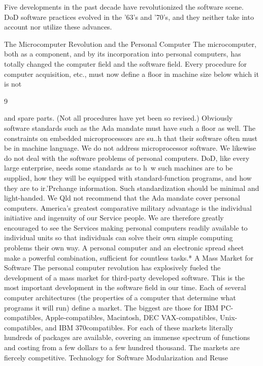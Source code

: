 \documentclass[12pt]{article}
\begin{document}
Five developments in the past decade have revolutionized the software scene. DoD
software practices evolved in the '63's and '70's, and they neither take into account nor
utilize these advances.

The Microcomputer Revolution and the Personal Computer
The microcomputer, both as a component, and by its incorporation into personal
computers, has totally changed the computer field and the software field. Every procedure
for computer acquisition, etc., must now define a floor in machine size below which it is not

9

and spare parts. (Not all procedures have yet been so revised.)
Obviously software standards such as the Ada mandate must have such a floor as well.
The constraints on embedded microprocessors are su..h that their software often must be
in machine language. We do not address microprocessor software.
We likewise do not deal with the software problems of personal computers. DoD,
like every large enterprise, needs some standards as to h~w such machines are to be
supplied, how they will be equipped with standard-function programs, and how they are to
ir.'Prchange information. Such standardization should be minimal and light-handed. We
Qld not recommend that the Ada mandate cover personal computers.
America's greatest comparative military advantage is the individual initiative and
ingenuity of our Service people. We are therefore greatly encouraged to see the Services
making personal computers readily available to individual units so that individuals can
solve their own simple computing problems their own way. A personal computer and an
electronic spread sheet make a powerful combination, sufficient for countless tasks.*
A Mass Market for Software
The personal computer revolution has explosively fueled the development of a mass
market for third-party developed software. This is the most important development in the
software field in our time.
Each of several computer architectures (the properties of a computer that determine
what programs it will run) define a market. The biggest are those for IBM PC-compatibles,
Apple-compatibles, Macintosh, DEC VAX-compatibles, Unix-compatibles, and IBM 370compatibles. For each of these markets literally hundreds of packages are available, covering
an immense spectrum of functions and costing from a few dollars to a few hundred
thousand. The markets are fiercely competitive.
Technology for Software Modularization and Reuse
\end{document}
